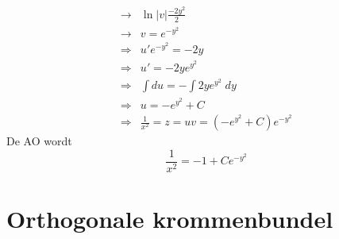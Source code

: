 {\begin{equation*}
\begin{split}
      \rightarrow & \ln|v| \frac{-2y^2}{2} \\
      \rightarrow & v = e^{-y^{2}} \\
      \Rightarrow & u'e^{-y^{2}} = -2y \\
      \Rightarrow & u' = -2ye^{y^{2}} \\
      \Rightarrow & \int du = - \int 2ye^{y^{2}} \; dy \\
      \Rightarrow & u = -e^{y^{2}} + C \\
      \Rightarrow & \frac{1}{x^2} = z = uv = (-e^{y^{2}} + C)e^{-y^{2}}
     \end{split}
    \end{equation*}
    De AO wordt 
    $$\frac{1}{x^2} = -1 + Ce^{-y^{2}}$$  
}

\section{Orthogonale krommenbundel}
